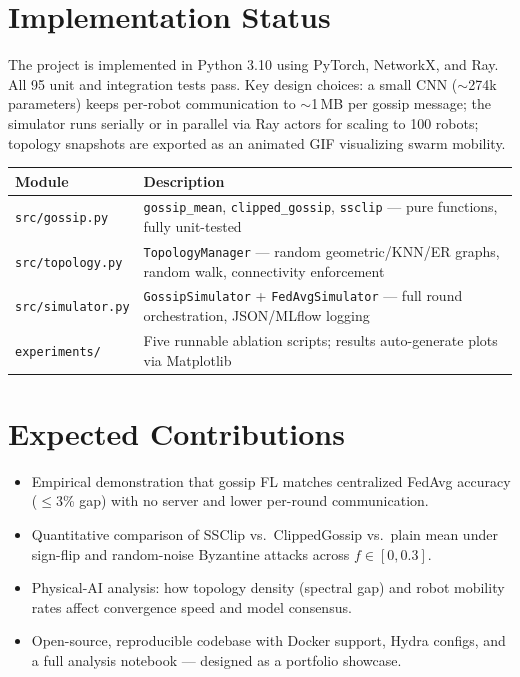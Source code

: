 \documentclass[10pt,letterpaper]{article}
\begin{document}
\section{Implementation Status}

The project is implemented in Python 3.10 using PyTorch, NetworkX, and Ray. All 95 unit and integration tests pass. Key design choices: a small CNN ($\sim$274k parameters) keeps per-robot communication to $\sim$1\,MB per gossip message; the simulator runs serially or in parallel via Ray actors for scaling to 100 robots; topology snapshots are exported as an animated GIF visualizing swarm mobility.

\vspace{4pt}

\begin{center}
\small
\begin{tabular}{lp{9cm}}
\toprule
\textbf{Module} & \textbf{Description} \\
\midrule
\texttt{src/gossip.py} & \texttt{gossip\_mean}, \texttt{clipped\_gossip}, \texttt{ssclip} — pure functions, fully unit-tested \\
\texttt{src/topology.py} & \texttt{TopologyManager} — random geometric/KNN/ER graphs, random walk, connectivity enforcement \\
\texttt{src/simulator.py} & \texttt{GossipSimulator} + \texttt{FedAvgSimulator} — full round orchestration, JSON/MLflow logging \\
\texttt{experiments/} & Five runnable ablation scripts; results auto-generate plots via Matplotlib \\
\bottomrule
\end{tabular}
\end{center}

\section{Expected Contributions}

\begin{itemize}
  \item Empirical demonstration that gossip FL matches centralized FedAvg accuracy ($\leq$3\% gap) with no server and lower per-round communication.
  \item Quantitative comparison of SSClip vs.\ ClippedGossip vs.\ plain mean under sign-flip and random-noise Byzantine attacks across $f \in [0, 0.3]$.
  \item Physical-AI analysis: how topology density (spectral gap) and robot mobility rates affect convergence speed and model consensus.
  \item Open-source, reproducible codebase with Docker support, Hydra configs, and a full analysis notebook — designed as a portfolio showcase.
\end{itemize}
\end{document}
